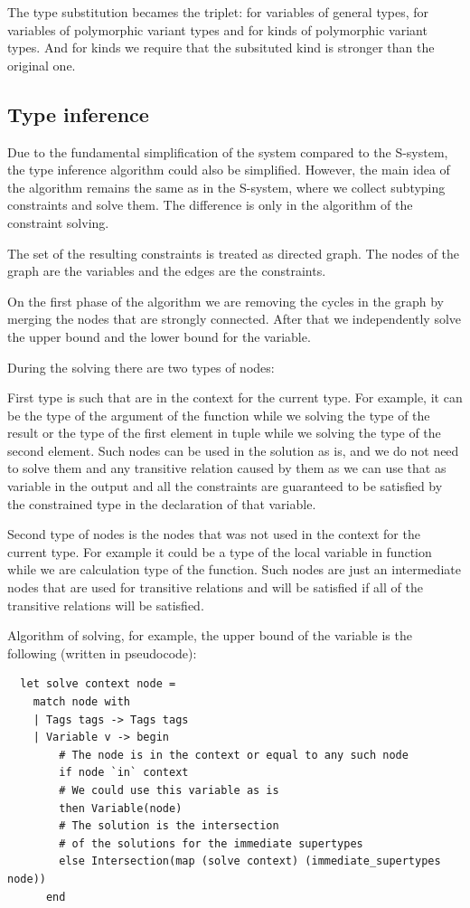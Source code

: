 \documentclass[a4paper,11pt,oneside]{article}
\theoremstyle{definition}
\begin{document}
The type substitution becames the triplet: for variables of general types, for variables of polymorphic variant types and for kinds of polymorphic variant types. And for kinds we require that the subsituted kind is stronger than the original one.

\subsection{Type inference}

Due to the fundamental simplification of the system compared to the S-system, the type inference algorithm could also be simplified.
However, the main idea of the algorithm remains the same as in the S-system, where we collect subtyping constraints and solve them.
The difference is only in the algorithm of the constraint solving.

The set of the resulting constraints is treated as directed graph.
The nodes of the graph are the variables and the edges are the constraints.

On the first phase of the algorithm we are removing the cycles in the graph by merging the nodes that are strongly connected.
After that we independently solve the upper bound and the lower bound for the variable.

During the solving there are two types of nodes:

First type is such that are in the context for the current type.
For example, it can be the type of the argument of the function while we solving the type of the result or the type of the first element in tuple while we solving the type of the second element.
Such nodes can be used in the solution as is, and we do not need to solve them and any transitive relation caused by them as we can use that as variable in the output and all the constraints are guaranteed to be satisfied by the constrained type in the declaration of that variable.

Second type of nodes is the nodes that was not used in the context for the current type.
For example it could be a type of the local variable in function while we are calculation type of the function.
Such nodes are just an intermediate nodes that are used for transitive relations and will be satisfied if all of the transitive relations will be satisfied.

Algorithm of solving, for example, the upper bound of the variable is the following (written in pseudocode):

{\ttfamily\begin{verbatim}
  let solve context node =
    match node with
    | Tags tags -> Tags tags
    | Variable v -> begin
        # The node is in the context or equal to any such node
        if node `in` context
        # We could use this variable as is
        then Variable(node)
        # The solution is the intersection
        # of the solutions for the immediate supertypes
        else Intersection(map (solve context) (immediate_supertypes node))
      end
\end{verbatim}}
\end{document}
